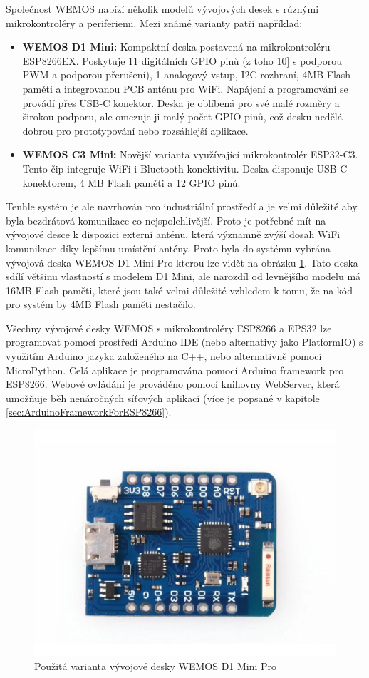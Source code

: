 Společnost WEMOS nabízí několik modelů vývojových desek s různými mikrokontroléry a periferiemi. Mezi známé varianty patří například:
\begin{itemize}
	\item \textbf{WEMOS D1 Mini:} Kompaktní deska postavená na mikrokontroléru ESP8266EX. Poskytuje 11 digitálních GPIO pinů (z toho 10] s podporou PWM a podporou přerušení), 1 analogový vstup, I2C rozhraní, 4MB Flash paměti a integrovanou PCB anténu pro WiFi. Napájení a programování se provádí přes USB-C konektor. Deska je oblíbená pro své malé rozměry a širokou podporu, ale omezuje ji malý počet GPIO pinů, což desku nedělá dobrou pro prototypování nebo rozsáhlejší aplikace.
	\item \textbf{WEMOS C3 Mini:} Novější varianta využívající mikrokontrolér ESP32-C3. Tento čip integruje WiFi i Bluetooth konektivitu. Deska disponuje USB-C konektorem, 4 MB Flash paměti a 12 GPIO pinů.
\end{itemize}

Tenhle systém je ale navrhován pro industriální prostředí a je velmi důležité aby byla bezdrátová komunikace co nejspolehlivější. Proto je potřebné mít na vývojové desce k dispozici externí anténu, která významně zvýší dosah WiFi komunikace díky lepšímu umístění antény. Proto byla do systému vybrána vývojová deska WEMOS D1 Mini Pro kterou lze vidět na obrázku \ref{fig:WEMOSD1MiniPro}. Tato deska sdílí většinu vlastností s modelem D1 Mini, ale narozdíl od levnějšího modelu má 16MB Flash paměti, které jsou také velmi důležité vzhledem k tomu, že na kód pro systém by 4MB Flash paměti nestačilo.

Všechny vývojové desky WEMOS s mikrokontroléry ESP8266 a EPS32 lze programovat pomocí prostředí Arduino IDE (nebo alternativy jako PlatformIO) s využitím Arduino jazyka založeného na C++, nebo alternativně pomocí MicroPython. Celá aplikace je programována pomocí Arduino framework pro ESP8266. Webové ovládání je prováděno pomocí knihovny WebServer, která umožňuje běh nenáročných síťových aplikací (více je popsané v kapitole \ref{sec:ArduinoFrameworkForESP8266}).

\begin{figure}[hptb]
	\centering
	\includegraphics[width=0.8\linewidth]{images/WEMOS_D1_Mini_Pro.png}
	\caption{Použitá varianta vývojové desky WEMOS D1 Mini Pro \cite{WEMOSD1MiniPro}}
	\label{fig:WEMOSD1MiniPro}
\end{figure}

